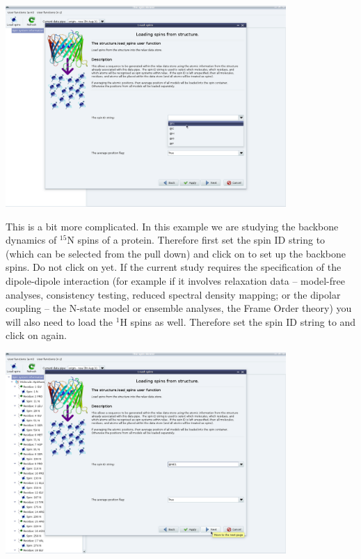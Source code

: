 \begin{minipage}[h]{\linewidth}
\centerline{\includegraphics[width=0.8\textwidth, bb=14 14 1415 1019]{graphics/screenshots/spin_viewer/wizard_load_spins_n}}
\end{minipage}

This is a bit more complicated.  In this example we are studying the backbone dynamics of $^{15}$N spins of a protein.  Therefore first set the spin ID string to  (which can be selected from the pull down) and click on  to set up the backbone spins.  Do not click on  yet.  If the current study requires the specification of the dipole-dipole interaction (for example if it involves relaxation data -- model-free analyses, consistency testing, reduced spectral density mapping; or the dipolar coupling -- the N-state model or ensemble analyses, the Frame Order theory) you will also need to load the $^1$H spins as well.  Therefore set the spin ID string to  and click on  again.


\begin{minipage}[h]{\linewidth}
\centerline{\includegraphics[width=0.8\textwidth, bb=14 14 1415 1019]{graphics/screenshots/spin_viewer/wizard_load_spins_ne1}}
\end{minipage}

